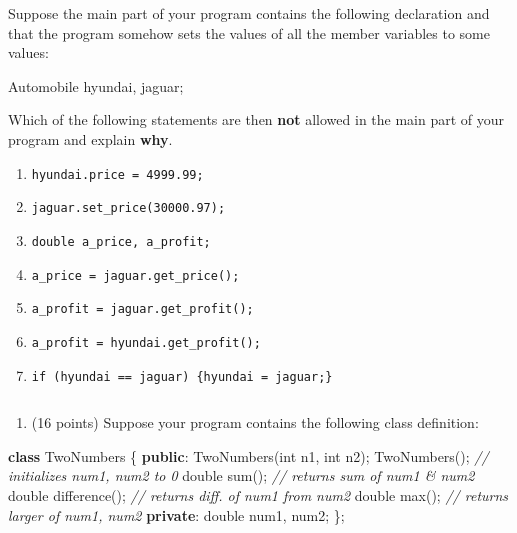\documentclass[
]{article}
\newenvironment{Shaded}{}{}
\newcommand{\CommentTok}[1]{\textcolor[rgb]{0.38,0.63,0.69}{\textit{#1}}}
\newcommand{\DataTypeTok}[1]{\textcolor[rgb]{0.56,0.13,0.00}{#1}}
\newcommand{\KeywordTok}[1]{\textcolor[rgb]{0.00,0.44,0.13}{\textbf{#1}}}
\newcommand{\NormalTok}[1]{#1}
\providecommand{\tightlist}{%
  \setlength{\itemsep}{0pt}\setlength{\parskip}{0pt}}
\begin{document}
Suppose the main part of your program contains the following declaration
and that the program somehow sets the values of all the member variables
to some values:

\begin{Shaded}
\begin{Highlighting}[]
\NormalTok{Automobile hyundai, jaguar; }
\end{Highlighting}
\end{Shaded}

Which of the following statements are then \textbf{not} allowed in the
main part of your program and explain \textbf{why}.

\begin{enumerate}
\def\labelenumi{(\alph{enumi})}
\tightlist
\item
  \texttt{hyundai.price\ =\ 4999.99;}
\item
  \texttt{jaguar.set\_price(30000.97);}
\item
  \texttt{double\ a\_price,\ a\_profit;}
\item
  \texttt{a\_price\ =\ jaguar.get\_price();}
\item
  \texttt{a\_profit\ =\ jaguar.get\_profit();}
\item
  \texttt{a\_profit\ =\ hyundai.get\_profit();}
\item
  \texttt{if\ (hyundai\ ==\ jaguar)\ \{hyundai\ =\ jaguar;\}}
\end{enumerate}

\begin{verbatim}
\end{verbatim}

\pagebreak

\begin{enumerate}
\def\labelenumi{\arabic{enumi}.}
\setcounter{enumi}{5}
\tightlist
\item
  (16 points) Suppose your program contains the following class
  definition:
\end{enumerate}

\begin{Shaded}
\begin{Highlighting}[]
\KeywordTok{class}\NormalTok{ TwoNumbers \{}
   \KeywordTok{public}\NormalTok{:}
\NormalTok{      TwoNumbers(}\DataTypeTok{int}\NormalTok{ n1, }\DataTypeTok{int}\NormalTok{ n2);}
\NormalTok{      TwoNumbers(); }\CommentTok{// initializes num1, num2 to 0}
      \DataTypeTok{double}\NormalTok{ sum(); }\CommentTok{// returns sum of num1 \& num2}
      \DataTypeTok{double}\NormalTok{ difference(); }\CommentTok{// returns diff. of num1 from num2}
      \DataTypeTok{double}\NormalTok{ max(); }\CommentTok{// returns larger of num1, num2}
   \KeywordTok{private}\NormalTok{:}
      \DataTypeTok{double}\NormalTok{ num1, num2;}
\NormalTok{\};}
\end{Highlighting}
\end{Shaded}
\end{document}
